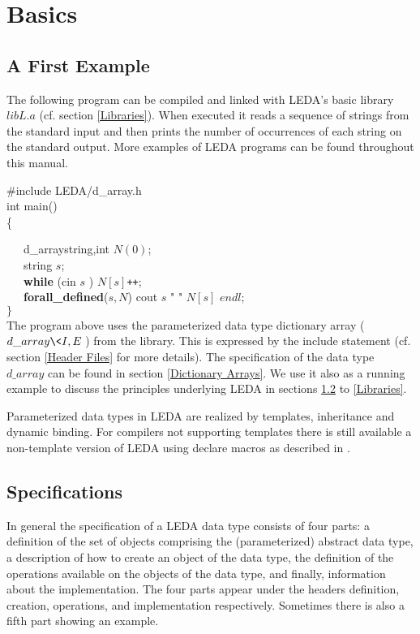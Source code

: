 \chapter{Basics}

\label{Basics}

\section{A First Example}

\label{A First Example}
The following program can be compiled and linked 
with LEDA's basic library $libL.a$ (cf. section \ref{Libraries}).
When executed it reads a sequence of strings from the standard input and then 
prints the number of occurrences of each string on the standard output. More 
examples of LEDA programs can be found throughout this manual.

\#include \<LEDA/d\_array.h\>\\
int main()\\
\{

\ \ \ d\_array\<string,int\> $N(0)$;\\
\smallskip
\ \ \ string $s$;\\
\smallskip
\ \ \ {\bf while} (cin \>\> $s$ ) $N[s]${\tt ++};\\
\smallskip
\ \ \ {\bf forall\_defined}($s,N$) 
                cout \<\< $s$ \<\< " " \<\< $N[s]$ \<\< $endl$;\\
\smallskip
$\}$\\


The program above uses the parameterized data type dictionary array 
($d\_array\<I,E\>$) from the library. This is expressed by the include 
statement (cf. section \ref{Header Files} for more details). The specification 
of the 
data type $d\_array$ can be found in section \ref{Dictionary Arrays}.
We use it also as a 
running example to discuss the principles underlying LEDA in sections 
\ref{Specifications}
to \ref{Libraries}.

Parameterized data types in LEDA are realized by templates,
inheritance and dynamic binding. 
For \CC compilers not supporting templates there is still available a 
non-template version of LEDA using declare macros as described in \cite{N90}.


\section{Specifications}

\label{Specifications}
In general the specification of a LEDA data type consists of four parts:
a definition of the set of objects comprising the (parameterized) abstract
data type, a description of how to create an object of the data type,
the definition of the operations available on the objects of the data 
type, and finally, information about the implementation. The four parts 
appear under the headers definition, creation, operations, and implementation 
respectively.
Sometimes there is also a fifth part showing an example.

